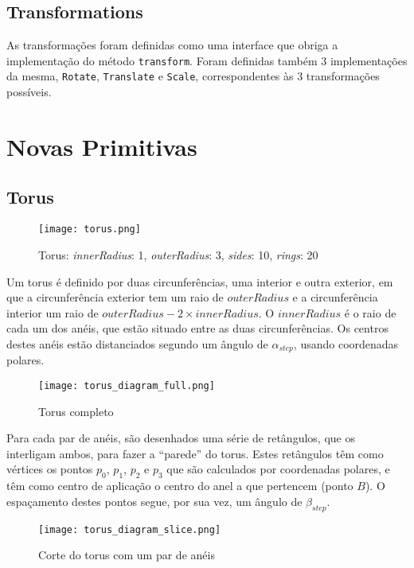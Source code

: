 \documentclass[a4paper]{article}
\newcommand{\x}{\times}
\begin{document}
\subsection{Transformations}

As transformações foram definidas como uma interface que obriga a
implementação do método \texttt{transform}. Foram definidas também 3 implementações
da mesma, \texttt{Rotate}, \texttt{Translate} e \texttt{Scale}, correspondentes
às 3 transformações possíveis.

\section{Novas Primitivas}

\subsection{Torus}

\begin{figure}[H]
    \centering 
    \texttt{[image: torus.png]}
    \caption{Torus: \textit{innerRadius}: 1, \textit{outerRadius}: 3, \textit{sides}: 10, \textit{rings}: 20}
\end{figure}

Um torus é definido por duas circunferências, uma interior e outra exterior, em
que a circunferência exterior tem um raio de $outerRadius$ e a circunferência interior um raio
de $outerRadius - 2 \x innerRadius$.
O $innerRadius$ é o raio de cada um dos anéis, que estão situado entre as duas circunferências. Os
centros destes anéis estão distanciados segundo um ângulo de $\alpha_{step}$,
usando coordenadas polares.

\begin{figure}[H]
    \centering
    \texttt{[image: torus\_diagram\_full.png]}
    \caption{Torus completo}
\end{figure}

Para cada par de anéis, são desenhados uma série de retângulos, que os interligam ambos, para fazer a ``parede'' do torus. Estes retângulos têm como vértices os pontos $p_0$, $p_1$, $p_2$ e $p_3$ que são calculados por coordenadas polares, e têm como centro de aplicação o centro do anel a que pertencem (ponto $B$). O espaçamento destes pontos segue, por sua vez, um ângulo de $\beta_{step}$.

\begin{figure}[H]
    \centering
    \texttt{[image: torus\_diagram\_slice.png]}
    \caption{Corte do torus com um par de anéis}
\end{figure}
\end{document}
